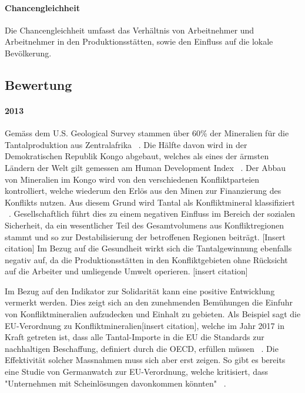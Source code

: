\paragraph{Chancengleichheit}

Die Chancengleichheit umfasst das Verhältnis von Arbeitnehmer und
Arbeitnehmer in den Produktionsstätten, sowie den Einfluss auf die lokale
Bevölkerung.

\subsection{Bewertung}

\paragraph{2013} Gemäss dem U.S. Geological Survey stammen über 60\% der Mineralien für die
Tantalproduktion aus Zentralafrika ~\cite{USGSMine8}. Die Hälfte davon
wird in der Demokratischen Republik Kongo abgebaut, welches als eines der ärmsten
Ländern der Welt gilt gemessen am Human Development Index ~\cite{UNDProgramme2018}. Der Abbau von Mineralien im
Kongo wird von den verschiedenen Konfliktparteien kontrolliert, welche wiederum
den Erlös aus den Minen zur Finanzierung des Konflikts nutzen. Aus diesem Grund
wird Tantal als Konfliktmineral klassifiziert ~\cite{doevenspeck2012konfliktmineralien}.
Gesellschaftlich führt dies zu einem negativen Einfluss im Bereich der sozialen
Sicherheit, da ein wesentlicher Teil des Gesamtvolumens aus Konfliktregionen
stammt und so zur Destabilisierung der betroffenen Regionen beiträgt. [Insert citation]
Im Bezug auf die Gesundheit wirkt sich die Tantalgewinnung ebenfalls negativ auf, da die 
Produktionsstätten in den Konfliktgebieten ohne Rücksicht auf die Arbeiter und umliegende Umwelt
operieren. [insert citation]

Im Bezug auf den Indikator zur Solidarität kann eine positive Entwicklung vermerkt werden.
Dies zeigt sich an den zunehmenden Bemühungen die Einfuhr von Konfliktmineralien 
aufzudecken und Einhalt zu gebieten. Als Beispiel sagt die EU-Verordnung zu Konfliktmineralien[insert citation], 
welche im Jahr 2017 in Kraft getreten ist, dass alle Tantal-Importe in die EU die Standards zur nachhaltigen Beschaffung, 
definiert durch die OECD, erfüllen müssen ~\cite{europeancommission}. Die Effektivität solcher 
Massnahmen muss sich aber erst zeigen. So gibt es bereits eine Studie von Germanwatch zur EU-Verordnung, 
welche kritisiert, dass "Unternehmen mit Scheinlösungen davonkommen könnten" ~\cite{Governan35}.

